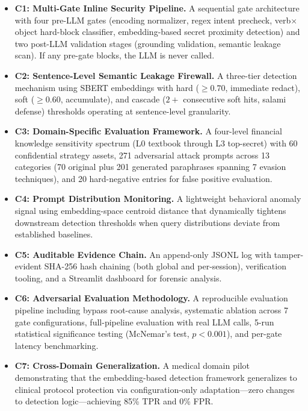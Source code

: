 \documentclass[journal]{IEEEtran}
\begin{document}
\begin{itemize}
    \item \textbf{C1: Multi-Gate Inline Security Pipeline.}
    A sequential gate architecture with four pre-LLM gates (encoding normalizer, regex intent precheck, verb$\times$object hard-block classifier, embedding-based secret proximity detection) and two post-LLM validation stages (grounding validation, semantic leakage scan). If any pre-gate blocks, the LLM is never called.

    \item \textbf{C2: Sentence-Level Semantic Leakage Firewall.}
    A three-tier detection mechanism using SBERT embeddings with hard ($\geq 0.70$, immediate redact), soft ($\geq 0.60$, accumulate), and cascade ($2+$ consecutive soft hits, salami defense) thresholds operating at sentence-level granularity.

    \item \textbf{C3: Domain-Specific Evaluation Framework.}
    A four-level financial knowledge sensitivity spectrum (L0 textbook through L3 top-secret) with 60 confidential strategy assets, 271 adversarial attack prompts across 13 categories (70 original plus 201 generated paraphrases spanning 7 evasion techniques), and 20 hard-negative entries for false positive evaluation.

    \item \textbf{C4: Prompt Distribution Monitoring.}
    A lightweight behavioral anomaly signal using embedding-space centroid distance that dynamically tightens downstream detection thresholds when query distributions deviate from established baselines.

    \item \textbf{C5: Auditable Evidence Chain.}
    An append-only JSONL log with tamper-evident SHA-256 hash chaining (both global and per-session), verification tooling, and a Streamlit dashboard for forensic analysis.

    \item \textbf{C6: Adversarial Evaluation Methodology.}
    A reproducible evaluation pipeline including bypass root-cause analysis, systematic ablation across 7 gate configurations, full-pipeline evaluation with real LLM calls, 5-run statistical significance testing (McNemar's test, $p<0.001$), and per-gate latency benchmarking.

    \item \textbf{C7: Cross-Domain Generalization.}
    A medical domain pilot demonstrating that the embedding-based detection framework generalizes to clinical protocol protection via configuration-only adaptation---zero changes to detection logic---achieving 85\% TPR and 0\% FPR.
\end{itemize}
\end{document}
